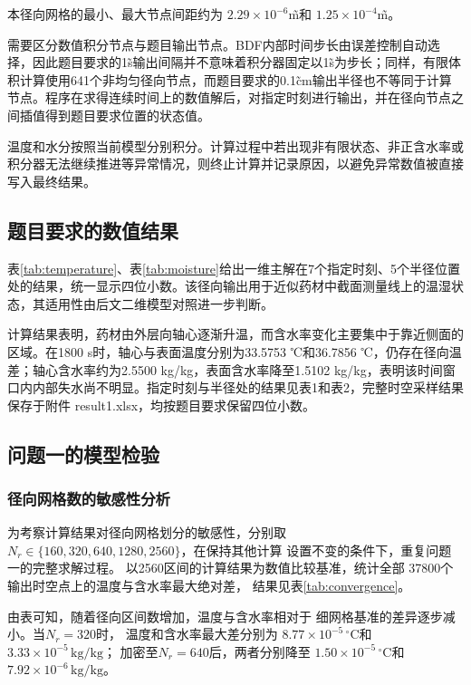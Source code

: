 \documentclass[withoutpreface]{cumcmthesis}
\begin{document}
本径向网格的最小、最大节点间距约为
$2.29\times10^{-6}$\~m和
$1.25\times10^{-4}$\~m。

需要区分数值积分节点与题目输出节点。BDF内部时间步长由误差控制自动选择，因此题目要求的1\~s输出间隔并不意味着积分器固定以1\~s为步长；同样，有限体积计算使用641个非均匀径向节点，而题目要求的0.1\~cm输出半径也不等同于计算节点。程序在求得连续时间上的数值解后，对指定时刻进行输出，并在径向节点之间插值得到题目要求位置的状态值。

温度和水分按照当前模型分别积分。计算过程中若出现非有限状态、非正含水率或积分器无法继续推进等异常情况，则终止计算并记录原因，以避免异常数值被直接写入最终结果。

\subsection{题目要求的数值结果}

表\ref{tab:temperature}、表\ref{tab:moisture}给出一维主解在7个指定时刻、5个半径位置处的结果，统一显示四位小数。该径向输出用于近似药材中截面测量线上的温湿状态，其适用性由后文二维模型对照进一步判断。



计算结果表明，药材由外层向轴心逐渐升温，而含水率变化主要集中于靠近侧面的区域。在1800 s时，轴心与表面温度分别为33.5753 ℃和36.7856 ℃，仍存在径向温差；轴心含水率约为2.5500 kg/kg，表面含水率降至1.5102 kg/kg，表明该时间窗口内内部失水尚不明显。指定时刻与半径处的结果见表1和表2，完整时空采样结果保存于附件 result1.xlsx，均按题目要求保留四位小数。


\subsection{问题一的模型检验}\label{sec:q1check}

\subsubsection{径向网格数的敏感性分析}

为考察计算结果对径向网格划分的敏感性，分别取
$N_r\in\{160,320,640,1280,2560\}$，在保持其他计算
设置不变的条件下，重复问题一的完整求解过程。
以2560区间的计算结果为数值比较基准，统计全部
37800个输出时空点上的温度与含水率最大绝对差，
结果见表\ref{tab:convergence}。



由表可知，随着径向区间数增加，温度与含水率相对于
细网格基准的差异逐步减小。当$N_r=320$时，
温度和含水率最大差分别为
$8.77\times10^{-5}\,{}^\circ\mathrm{C}$和
$3.33\times10^{-5}\,\mathrm{kg/kg}$；
加密至$N_r=640$后，两者分别降至
$1.50\times10^{-5}\,{}^\circ\mathrm{C}$和
$7.92\times10^{-6}\,\mathrm{kg/kg}$。
\end{document}
